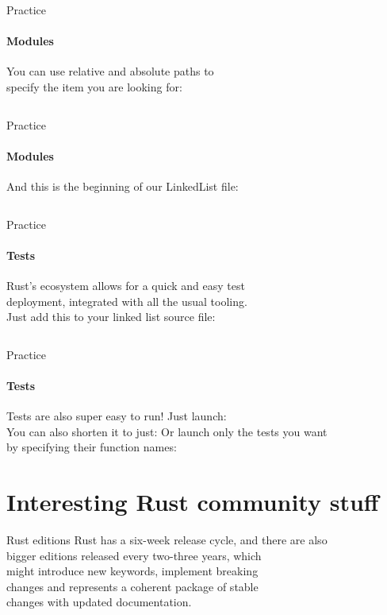\documentclass[usenames,dvipsnames,10pt,aspectratio=169]{beamer}
\begin{document}
\begin{frame}{Practice}
	\framesubtitle{Modules}
	\large
	You can use relative and absolute paths to\\
	specify the item you are looking for:\\
	\vspace{0.1cm}
	\inputminted[fontsize=\normalsize]{rust}{code/modules.rs}
\end{frame}

\begin{frame}{Practice}
	\framesubtitle{Modules}
	\large
	And this is the beginning of our LinkedList file:
	\vspace{0.3cm}
	\inputminted[fontsize=\large]{rust}{code/list11.rs}
\end{frame}

\begin{frame}{Practice}
	\framesubtitle{Tests}
	\large
	Rust's ecosystem allows for a quick and easy test\\
	deployment, integrated with all the usual tooling.\\
	Just add this to your linked list source file:\\
	\vspace{0.2cm}
	\inputminted[fontsize=\normalsize]{rust}{code/list12.rs}
	\vspace{0.3cm}
\end{frame}

\begin{frame}{Practice}
	\framesubtitle{Tests}
	\large
	Tests are also super easy to run! Just launch:\\
	\vspace{0.3cm}
	You can also shorten it to just: 
	\vspace{0.3cm}
Or launch only the tests you want\\
by specifying their function names: 
	
\end{frame}


\section{Interesting Rust community stuff}

\begin{frame}{Rust editions}
	\Large
	Rust has a six-week release cycle, and there are also\\
	bigger editions released every two-three years, which\\
	might introduce new keywords, implement breaking\\
	changes	and represents a coherent package of stable\\
	changes with updated documentation.\\

\end{frame}
\end{document}
